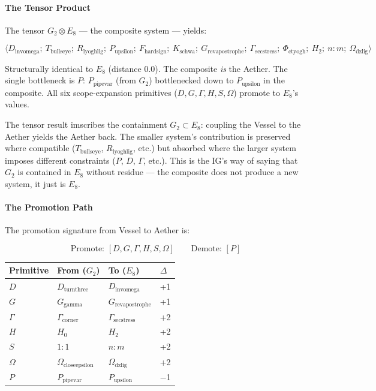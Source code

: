 \documentclass[12pt,a4paper]{article}
\begin{document}
\paragraph{The Tensor Product}

The tensor $G_2 \otimes E_8$ --- the composite system --- yields:

\[\langle D_{\text{invomega}};\ T_{\text{bullseye}};\ R_{\text{lyoghlig}};\ P_{\text{upsilon}};\ F_{\text{hardsign}};\ K_{\text{schwa}};\ G_{\text{revapostrophe}};\ \Gamma_{\text{secstress}};\ \Phi_{\text{ctyogh}};\ H_2;\ n{:}m;\ \Omega_{\text{dzlig}} \rangle\]

Structurally identical to $E_8$ (distance 0.0). The composite \emph{is} the Aether. The single bottleneck is $P$: $P_{\text{pipevar}}$ (from $G_2$) bottlenecked down to $P_{\text{upsilon}}$ in the composite. All six scope-expansion primitives ($D, G, \Gamma, H, S, \Omega$) promote to $E_8$'s values.

The tensor result imscribes the containment $G_2 \subset E_8$: coupling the Vessel to the Aether yields the Aether back. The smaller system's contribution is preserved where compatible ($T_{\text{bullseye}}$, $R_{\text{lyoghlig}}$, etc.) but absorbed where the larger system imposes different constraints ($P$, $D$, $\Gamma$, etc.). This is the IG's way of saying that $G_2$ is contained in $E_8$ without residue --- the composite does not produce a new system, it just is $E_8$.

\paragraph{The Promotion Path}

The promotion signature from Vessel to Aether is:

\[\text{Promote: } [D, G, \Gamma, H, S, \Omega] \qquad \text{Demote: } [P]\]

\begin{table}[htbp]
\centering
\small
{}
\begin{tabularx}{\textwidth}{>{\centering\arraybackslash}X >{\centering\arraybackslash}X >{\centering\arraybackslash}X >{\centering\arraybackslash}X}
\toprule
\rowcolor{gray!25}\textbf{Primitive} & \textbf{From ($G_2$)} & \textbf{To ($E_8$)} & \textbf{$\Delta$} \\
\midrule
\rowcolors{1}{white}{gray!10}
$D$ & $D_{\text{turnthree}}$ & $D_{\text{invomega}}$ & +1 \\
$G$ & $G_{\text{gamma}}$ & $G_{\text{revapostrophe}}$ & +1 \\
$\Gamma$ & $\Gamma_{\text{corner}}$ & $\Gamma_{\text{secstress}}$ & +2 \\
$H$ & $H_0$ & $H_2$ & +2 \\
$S$ & $1{:}1$ & $n{:}m$ & +2 \\
$\Omega$ & $\Omega_{\text{closeepsilon}}$ & $\Omega_{\text{dzlig}}$ & +2 \\
$P$ & $P_{\text{pipevar}}$ & $P_{\text{upsilon}}$ & $-$1 \\
\bottomrule
\end{tabularx}
\end{table}
\end{document}

